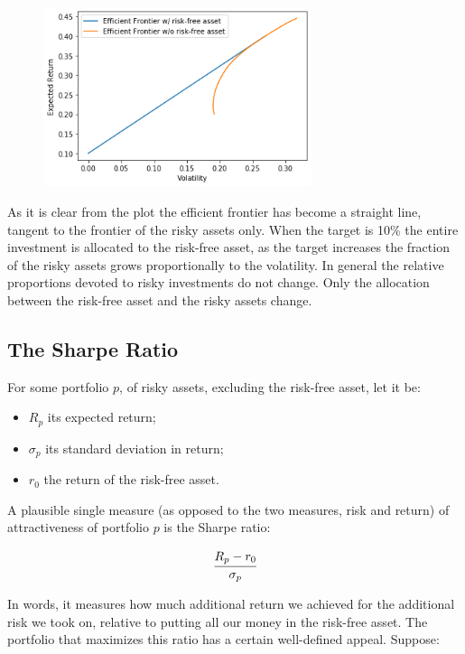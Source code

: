 \begin{figure}
\centering
    \includegraphics[width=0.7\textwidth]{figures/markowitz_13_1.png}
    \end{figure}
    
    As it is clear from the plot the efficient frontier has become a
straight line, tangent to the frontier of the risky assets only. When
the target is 10\% the entire investment is allocated to the risk-free
asset, as the target increases the fraction of the risky assets grows
proportionally to the volatility. In general the relative proportions
devoted to risky investments do not change. Only the allocation between
the risk-free asset and the risky assets change.

\subsection{The Sharpe Ratio}\label{the-sharpe-ratio}

For some portfolio \(p\), of risky assets, excluding the risk-free
asset, let it be:

\begin{itemize}
\tightlist
\item
  \(R_p\) its expected return;
\item
  \(\sigma_p\) its standard deviation in return;
\item
  \(r_0\) the return of the risk-free asset.
\end{itemize}

A plausible single measure (as opposed to the two measures, risk and
return) of attractiveness of portfolio \(p\) is the Sharpe ratio:

\[ \cfrac{R_p - r_0}{\sigma_p} \]

In words, it measures how much additional return we achieved for the
additional risk we took on, relative to putting all our money in the
risk-free asset. The portfolio that maximizes this ratio has a certain
well-defined appeal. Suppose:

